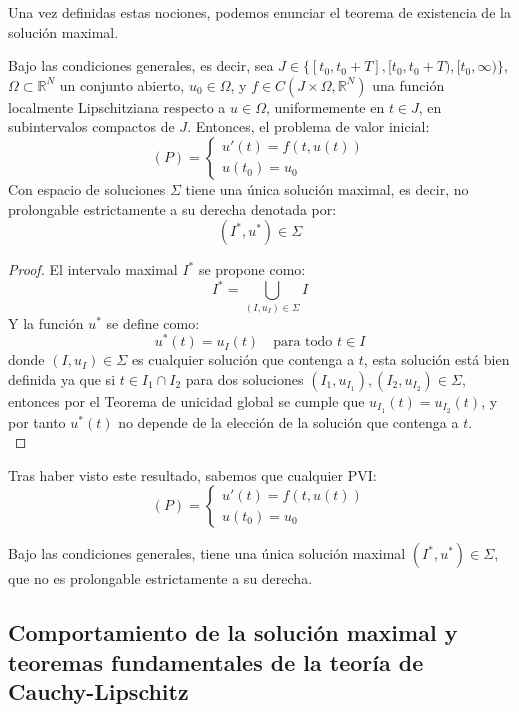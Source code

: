 Una vez definidas estas nociones, podemos enunciar el teorema de existencia de la solución maximal.

\begin{teorema}
    Bajo las condiciones generales, es decir, sea $J \in \{ [t_0, t_0 + T], [t_0, t_0 + T), [t_0, \infty) \}$, $\Omega \subset \mathbb{R}^N$ un conjunto abierto, $u_0 \in \Omega$, y $f \in C(J \times \Omega, \mathbb{R}^N)$ una función localmente Lipschitziana respecto a $u \in \Omega$, uniformemente en $t \in J$, en subintervalos compactos de $J$. Entonces, el problema de valor inicial:
    \[
        (P) =
        \begin{cases}
            u'(t) = f(t, u(t)) \\
            u(t_0) = u_0
        \end{cases}
    \]
    Con espacio de soluciones $\Sigma$ tiene una única solución maximal, es decir, no prolongable estrictamente a su derecha denotada por:
    \[  
        \boxed{(I^*, u^*) \in \Sigma}
    \]
\end{teorema}

\begin{proof}
    El intervalo maximal $I^*$ se propone como:
    \[
        I^* = \bigcup_{(I, u_I) \in \Sigma} I
    \]
    Y la función $u^*$ se define como:
    \[
        u^*(t) = u_I(t) \quad \text{para todo } t \in I
    \]
    donde $(I, u_I) \in \Sigma$ es cualquier solución que contenga a $t$, esta solución está bien definida ya que si $t \in I_1 \cap I_2$ para dos soluciones $(I_1, u_{I_1}), (I_2, u_{I_2}) \in \Sigma$, entonces por el Teorema de unicidad global se cumple que $u_{I_1}(t) = u_{I_2}(t)$, y por tanto $u^*(t)$ no depende de la elección de la solución que contenga a $t$.\\
\end{proof}

Tras haber visto este resultado, sabemos que cualquier PVI:
\[
    (P) =
    \begin{cases}
        u'(t) = f(t, u(t)) \\
        u(t_0) = u_0
    \end{cases}
\]

Bajo las condiciones generales, tiene una única solución maximal $(I^*, u^*) \in \Sigma$, que no es prolongable estrictamente a su derecha.

\subsection{Comportamiento de la solución maximal y teoremas fundamentales de la teoría de Cauchy-Lipschitz}


